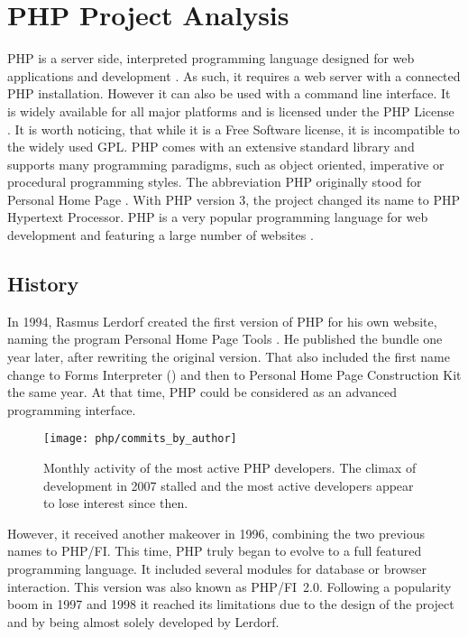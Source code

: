 \section{PHP Project Analysis} %


\noindent PHP is a server side, interpreted programming language designed for
web applications and development \cite{PHPIntro}. As such, it requires a web
server with a connected PHP installation. However it can also be used with a
command line interface. It is widely available for all major platforms and is
licensed under the PHP License \cite{PHPManual}. It is worth noticing, that
while it is a Free Software license, it is incompatible to the widely used
\ac{GPL}. PHP comes with an extensive standard library and supports many
programming paradigms, such as object oriented, imperative or procedural
programming styles. The abbreviation PHP originally stood for Personal Home
Page \cite{PHPHistory}. With PHP version 3, the project changed its name to PHP
Hypertext Processor. PHP is a very popular programming language for web
development and featuring a large number of websites
\cite{PHPW3Techs,PHPStats}.

\subsection{History} %

In 1994, Rasmus Lerdorf created the first version of PHP for his own website,
naming the program Personal Home Page Tools \cite{PHPHistory}. He published the
bundle one year later, after rewriting the original version. That also included
the first name change to Forms Interpreter () and then to
Personal Home Page Construction Kit the same year. At that time, PHP could be
considered as an advanced programming interface.

\begin{figure}[htbp]
  \centering
  \texttt{[image: php/commits\_by\_author]}
  \caption[Commits by Most Active Authors, PHP]
  {Monthly activity of the most active PHP developers. The climax of
    development in 2007 stalled and the most active developers appear to lose
    interest since then.}
  \label{fig:php:cba}
\end{figure}

However, it received another makeover in 1996, combining the two previous names
to PHP/FI. This time, PHP truly began to evolve to a full featured programming
language. It included several modules for database or browser interaction. This
version was also known as PHP/FI~2.0. Following a popularity boom in 1997 and
1998 it reached its limitations due to the design of the project and by being
almost solely developed by Lerdorf.


